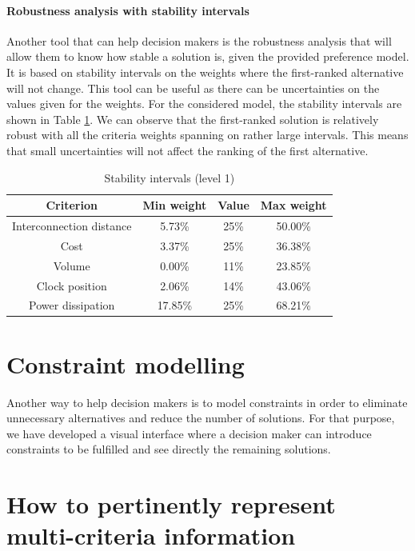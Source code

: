 \paragraph{Robustness analysis with stability intervals}
Another tool that can help decision makers is the robustness analysis that will allow them to know how stable a solution is, given the provided preference model. It is based on stability intervals on the weights where the first-ranked alternative will not change. This tool can be useful as there can be uncertainties on the values given for the weights. For the considered model, the stability intervals are shown in Table \ref{tab:stability}. We can observe that the first-ranked solution is relatively robust with all the criteria weights spanning on rather large intervals. This means that small uncertainties will not affect the ranking of the first alternative.

\begin{table}[h!]
\caption{Stability intervals (level 1)}
\begin{center}
\begin{tabular}{|c|c|c|c|}
\hline
Criterion & Min weight & Value  & Max weight \\
\hline
Interconnection distance & 5.73\% & 25\% & 50.00\% \\
Cost & 3.37\% & 25\% & 36.38\% \\
Volume & 0.00\% & 11\% & 23.85\% \\
Clock position & 2.06\% & 14\% & 43.06\% \\
Power dissipation & 17.85\% & 25\% & 68.21\% \\
\hline
\end{tabular}
\end{center}
\label{tab:stability}
\end{table}

\section{Constraint modelling}
Another way to help decision makers is to model constraints in order to eliminate unnecessary alternatives and reduce the number of solutions. For that purpose, we have developed a visual interface where a decision maker can introduce constraints to be fulfilled and see directly the remaining solutions.

\section{How to pertinently represent multi-criteria information}


